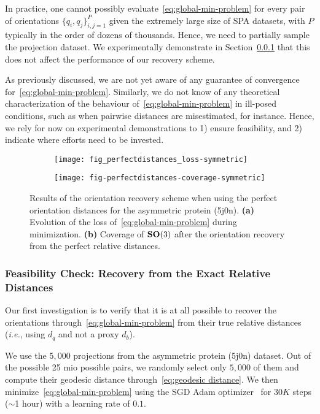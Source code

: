 In practice, one cannot possibly evaluate~\eqref{eq:global-min-problem} for every pair of orientations $\big\{q_i,q_j\big\}_{i,j=1}^P$ given the extremely large size of SPA datasets, with $P$ typically in the order of dozens of thousands. Hence, we need to partially sample the projection dataset. We experimentally demonstrate in Section~\ref{subsec:5-6-3-sanity-check} that this does not affect the performance of our recovery scheme.

As previously discussed, we are not yet aware of any guarantee of convergence for~\eqref{eq:global-min-problem}. Similarly, we do not know of any theoretical characterization of the behaviour of~\eqref{eq:global-min-problem} in ill-posed conditions, such as when pairwise distances are misestimated, for instance. Hence, we rely for now on experimental demonstrations to 1) ensure feasibility, and 2) indicate where efforts need to be invested.

\begin{figure}
    \centering
    \begin{subfigure}[b]{0.48\textwidth}
        \texttt{[image: fig\_perfectdistances\_loss-symmetric]}
        \caption{}
    \end{subfigure} \quad
    \begin{subfigure}[b]{0.48\textwidth}
    \centering
        \texttt{[image: fig-perfectdistances-coverage-symmetric]}
        \caption{}
    \end{subfigure}
    \caption{Results of the orientation recovery scheme when using the perfect orientation distances for the asymmetric protein (5j0n). \textbf{(a)} Evolution of the loss of~\eqref{eq:global-min-problem} during minimization. \textbf{(b)} Coverage of $\mathrm{\mathbf{SO}}(3)$ after the orientation recovery from the perfect relative distances. }
    \label{fig:minim-loss-perfect-distances}
\end{figure}

\subsubsection{Feasibility Check: Recovery from the Exact Relative Distances}
\label{subsec:5-6-3-sanity-check}

Our first investigation is to verify that it is at all possible to recover the orientations through~\eqref{eq:global-min-problem} from their true relative distances (\textit{i.e.}, using $d_q$ and not a proxy $d_b$).

We use the $5,000$ projections from the asymmetric protein (5j0n) dataset. Out of the possible 25 mio possible pairs, we randomly select only $5,000$ of them and compute their geodesic distance through~\eqref{eq:geodesic distance}. We then minimize~\eqref{eq:global-min-problem} using the SGD Adam optimizer~\cite{kingma2014adam} for $30K$ steps ($\sim$1 hour) with a learning rate of $0.1$.

